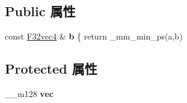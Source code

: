 \subsection*{Public 属性}
\begin{DoxyCompactItemize}
\item 
\mbox{\label{class_f32vec4_ac56e6361b5dc1071f812aefe2d41ca84}} 
const \hyperlink{class_f32vec4}{F32vec4} \& {\bfseries b} \{ return \+\_\+mm\+\_\+min\+\_\+ps(a,b)
\end{DoxyCompactItemize}
\subsection*{Protected 属性}
\begin{DoxyCompactItemize}
\item 
\mbox{\label{class_f32vec4_a81e096892eed22142ddf7e2ad31ddf64}} 
\+\_\+\+\_\+m128 {\bfseries vec}
\end{DoxyCompactItemize}

